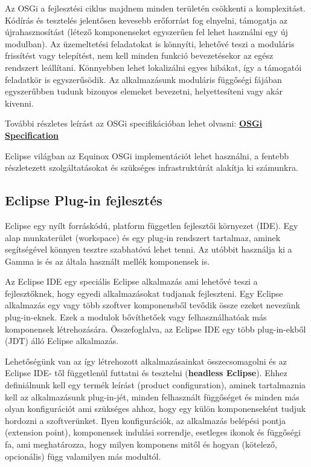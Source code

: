 Az OSGi a fejlesztési ciklus majdnem minden területén csökkenti a komplexitást. Kódírás és tesztelés jelentősen kevesebb erőforrást fog elnyelni, támogatja az újrahasznosítást (létező komponenseket egyszerűen fel lehet használni egy új modulban). Az üzemeltetési feladatokat is könnyíti, lehetővé teszi a moduláris frissítést vagy telepítést, nem kell minden funkció bevezetésekor az egész rendszert leállítani. Könnyebben lehet lokalizálni egyes hibákat, így a támogatói feladatkör is egyszerűsödik. Az alkalmazásunk moduláris függőségi fájában egyszerűbben tudunk bizonyos elemeket bevezetni, helyettesíteni vagy akár kivenni.

További részletes leírást az OSGi specifikációban lehet olvasni:  \textbf{\href{https://www.osgi.org/developer/specifications/}{OSGi Specification}}

Eclipse világban az Equinox OSGi implementációt lehet használni, a fentebb részletezett szolgáltatásokat és szükséges infrastruktúrát alakítja ki számunkra.

\subsection{Eclipse Plug-in fejlesztés}

Eclipse egy nyílt forráskódú, platform független fejlesztői környezet (IDE). Egy alap munkaterület (workspace) és egy plug-in rendszert tartalmaz, aminek segítségével könnyen tesztre szabhatóvá lehet tenni. Az utóbbit használja ki a Gamma is és az általa használt mellék komponensek is. 

Az Eclipse IDE egy speciális Eclipse alkalmazás ami lehetővé teszi a fejlesztőknek, hogy egyedi alkalmazásokat tudjanak fejleszteni. Egy Eclipse alkalmazás egy vagy több szoftver komponensből tevődik össze ezeket nevezünk plug-in-eknek. Ezek a modulok bővíthetőek vagy felhasználhatóak más komponensek létrehozására. Összefoglalva, az Eclipse IDE egy több plug-in-ekből (JDT) álló Eclipse alkalmazás.

Lehetőségünk van az így létrehozott alkalmazásainkat összecsomagolni és az Eclipse IDE- től függetlenül futtatni és tesztelni (\textbf{headless Eclipse}).
Ehhez definiálnunk kell egy termék leírást (product configuration), aminek tartalmaznia kell az alkalmazásunk plug-in-jét, minden felhasznált függőséget és minden más olyan konfigurációt ami szükséges ahhoz, hogy egy külön komponenseként tudjuk hordozni a szoftverünket. Ilyen konfigurációk, az alkalmazás belépési pontja (extension point), komponensek indulási sorrendje, esetleges ikonok és függőségi fa, ami meghatározza, hogy milyen komponens mitől és hogyan (kötelező, opcionális) függ valamilyen más modultól.

